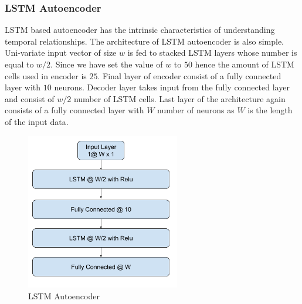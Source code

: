 \documentclass[12pt]{article}
\begin{document}
\subsubsection{LSTM Autoencoder }
LSTM based autoencoder has the intrinsic characteristics of understanding temporal relationships. The architecture of LSTM autoencoder is also simple. Uni-variate input vector of size $w$ is fed to stacked LSTM layers whose number is equal to $w/2$. Since we have set the value of $w$ to $50$ hence the amount of LSTM cells used in encoder is $25$. Final layer of encoder consist of a fully connected layer with $10$ neurons. Decoder layer takes input from the fully connected layer and consist of $w/2$ number of LSTM cells. Last layer of the architecture again consists of a fully connected layer with $W$ number of neurons as $W$ is the length of the input data.
\begin{figure}[H]
\center
        \includegraphics[width=0.6\textwidth]{images/architecture/LstmAutoencoder.png}
    \caption{LSTM Autoencoder}
    \label{lstmAutoencoder}
\end{figure}
\newpage
\end{document}
